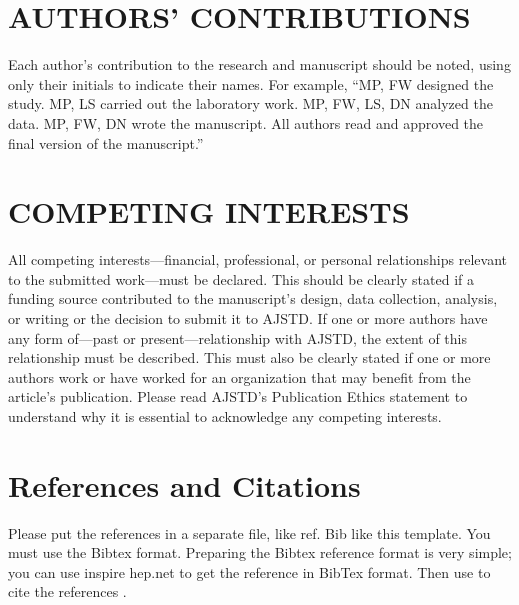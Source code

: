 \documentclass[twocolumn]{sintr}
\begin{document}
\lipsum[2-10]

\section*{AUTHORS’ CONTRIBUTIONS}

Each author’s contribution to the research and manuscript should be noted, using only their initials to indicate their names. For example, “MP, FW designed the study. MP, LS carried out the laboratory work. MP, FW, LS, DN analyzed the data. MP, FW, DN wrote the manuscript. All authors read and approved the final version of the manuscript.”

\section*{COMPETING INTERESTS}

All competing interests—financial, professional, or personal relationships relevant to the submitted work—must be declared. This should be clearly stated if a funding source contributed to the manuscript's design, data collection, analysis, or writing or the decision to submit it to AJSTD. If one or more authors have any form of—past or present—relationship with AJSTD, the extent of this relationship must be described. This must also be clearly stated if one or more authors work or have worked for an organization that may benefit from the article's publication. Please read AJSTD’s Publication Ethics statement to understand why it is essential to acknowledge any competing interests.

\lipsum[1]

\lipsum[2-14]

\section*{References and Citations}
Please put the references in a separate file, like ref. Bib like this template. You must use the Bibtex format. Preparing the Bibtex reference format is very simple; you can use inspire hep.net  to get the reference in BibTex format. Then use \cite{aa} to cite the references  \cite{bb}. 



\atColsEnd{\vfill}
\end{document}
